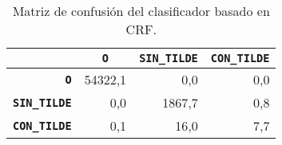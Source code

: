 \documentclass[runningheads,a4paper]{llncs}
\begin{document}
\begin{table}[ht]
	\addtolength{\abovecaptionskip}{-6mm}
	\addtolength{\belowcaptionskip}{-2mm}
 	\renewcommand{\arraystretch}{1.3}
	\renewcommand{\tabcolsep}{3pt}
	\caption{Matriz de confusión del clasificador basado en CRF.}
	\label{table:confusion-crf}
	\centering
	\begin{tabular}{|r||r|r|r|}
		\hline
			& \multicolumn{1}{c|}{\textbf{\texttt{~O~}}}
			& \multicolumn{1}{c|}{\textbf{\texttt{SIN\_TILDE}}}
			& \multicolumn{1}{c|}{\textbf{\texttt{CON\_TILDE}}} \\
		\hline\hline
		\textbf{\texttt{O}} & 54322,1 & 0,0 & 0,0 \\ \hline
		\textbf{\texttt{SIN\_TILDE}} & 0,0 & 1867,7 & 0,8 \\ \hline
		\textbf{\texttt{CON\_TILDE}} & 0,1 & 16,0 & 7,7 \\ 
		\hline
	\end{tabular}
\end{table}
\end{document}
